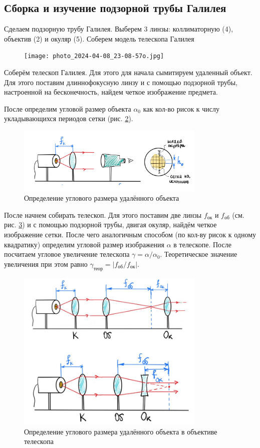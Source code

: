 \documentclass[a4paper,12pt]{article}
\theoremstyle{definition}
\begin{document}
\subsection{Сборка и изучение подзорной трубы Галилея}

Сделаем подзорную трубу Галилея. Выберем 3 линзы: коллиматорную (4), объектив (2) и окуляр (5). Соберем модель телескопа Галилея

\begin{figure}[h!]
    \centering
    \texttt{[image: photo\_2024-04-08\_23-08-57о.jpg]}
    \label{fig:vac}
\end{figure}

Соберём телескоп Галилея. Для этого для начала сымитируем удаленный объект. Для этого поставим длиннофокусную линзу и с помощью подзорной трубы, настроенной на бесконечность, найдем четкое изображение предмета. 

После определим угловой размер объекта $\alpha_0$ как кол-во рисок к числу укладывающихся периодов сетки (рис. \ref{pic:6}).

\begin{figure}[h!]
    \centering
    \includegraphics[width=9cm]{6.jpg}
    \caption{Определение углового размера удалённого объекта}\label{pic:6}
\end{figure}
После начнем собирать телескоп. Для этого поставим две линзы $f_\text{ок}$ и $f_\text{об}$ (см. рис. \ref{pic:7}) и с помощью подзорной трубы, двигая окуляр, найдём четкое изображение сетки. После чего аналогичным способом (по кол-ву рисок к одному квадратику) определим угловой размер изображения $\alpha$ в телескопе. После посчитаем угловое увеличение телескопа $\gamma = \alpha / \alpha_0$. Теоретическое значение увеличения при этом равно $\gamma_\text{теор}= |f_\text{об} / f_\text{ок}|$.

\begin{figure}[h!]
    \centering
    \includegraphics[width=9cm]{7.jpg}
    \caption{Определение углового размера удалённого объекта в объективе телескопа}\label{pic:7}
\end{figure}
\end{document}

